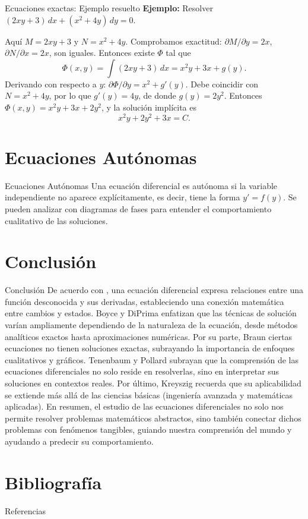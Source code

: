 \documentclass{beamer}
\begin{document}
\begin{frame}{Ecuaciones exactas: Ejemplo resuelto}
\textbf{Ejemplo:} Resolver $(2xy + 3)\,dx + (x^2 + 4y)\,dy = 0$.

Aquí $M=2xy+3$ y $N=x^2+4y$. Comprobamos exactitud: $\partial M/\partial y = 2x$, $\partial N/\partial x = 2x$, son iguales. Entonces existe $\Phi$ tal que
\[
\Phi(x,y) = \int (2xy+3)\,dx = x^2y + 3x + g(y).
\]
Derivando con respecto a $y$: $\partial \Phi/\partial y = x^2 + g'(y)$. Debe coincidir con $N = x^2 + 4y$, por lo que $g'(y) = 4y$, de donde $g(y) = 2y^2$. Entonces $\Phi(x,y) = x^2y + 3x + 2y^2$, y la solución implícita es
\[
x^2 y + 2y^2 + 3x = C.
\]
\end{frame}

\section{Ecuaciones Autónomas}
\begin{frame}{Ecuaciones Autónomas}
Una ecuación diferencial es autónoma si la variable independiente no aparece explícitamente, es decir, tiene la forma $y' = f(y)$. Se pueden analizar con diagramas de fases para entender el comportamiento cualitativo de las soluciones.
\end{frame}

\section{Conclusión}
\begin{frame}{Conclusión}
De acuerdo con \cite{zill2009ecuaciones}, una ecuación diferencial expresa relaciones entre una función desconocida y sus derivadas, estableciendo una conexión matemática entre cambios y estados.
Boyce y DiPrima \cite{boyce2010ecuaciones} enfatizan que las técnicas de solución varían ampliamente dependiendo de la naturaleza de la ecuación, desde métodos analíticos exactos hasta aproximaciones numéricas.
Por su parte, Braun \cite{braun1992applications} ciertas ecuaciones no tienen soluciones exactas, subrayando la importancia de enfoques cualitativos y gráficos.
Tenenbaum y Pollard \cite{tenenbaum1985ordinary} subrayan que la comprensión de las ecuaciones diferenciales no solo reside en resolverlas, sino en interpretar sus soluciones en contextos reales. Por último, Kreyszig \cite{kreyszig2011advanced} recuerda que su aplicabilidad se extiende más allá de las ciencias básicas (ingeniería avanzada y matemáticas aplicadas).
En resumen, el estudio de las ecuaciones diferenciales no solo nos permite resolver problemas matemáticos abstractos, sino también conectar dichos problemas con fenómenos tangibles, guiando nuestra comprensión del mundo y ayudando a predecir su comportamiento.
\end{frame}

\section{Bibliografía}
\begin{frame}[allowframebreaks]{Referencias}


\end{frame}
\end{document}

